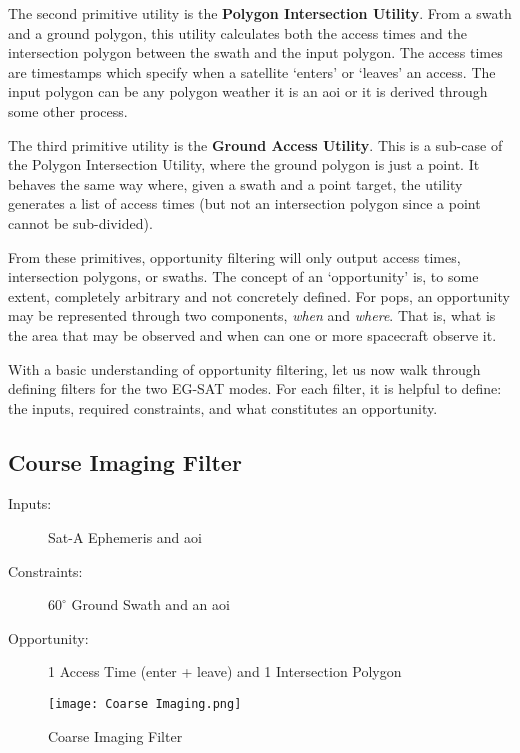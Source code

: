 The second primitive utility is the \textbf{Polygon Intersection Utility}.
From a swath and a ground polygon, this utility calculates both the access
times and the intersection polygon between the swath and the input polygon. The
access times are timestamps which specify when a satellite `enters' or `leaves'
an access. The input polygon can be any polygon weather it is an \gls{aoi} or
it is derived through some other process.

The third primitive utility is the \textbf{Ground Access Utility}. This is a
sub-case of the Polygon Intersection Utility, where the ground polygon is just
a point. It behaves the same way where, given a swath and a point target, the
utility generates a list of access times (but not an intersection polygon since
a point cannot be sub-divided).

From these primitives, opportunity filtering will only output access times,
intersection polygons, or swaths. The concept of an `opportunity' is, to some
extent, completely arbitrary and not concretely defined. For \gls{pops}, an
opportunity may be represented through two components, \textit{when} and
\textit{where}. That is, what is the area that may be observed and when can one
or more spacecraft observe it. 

With a basic understanding of opportunity filtering, let us now walk through
defining filters for the two EG-SAT modes. For each filter, it is helpful to
define: the inputs, required constraints, and what constitutes an opportunity.

\subsection{Course Imaging Filter}

\begin{description} 

    \item[Inputs:]  Sat-A Ephemeris and \gls{aoi}

    \item[Constraints:] $60^\circ$ Ground Swath and an \gls{aoi}

    \item[Opportunity:] 1 Access Time (enter + leave) and 1 Intersection Polygon

\end{description} 

\begin{figure}[h]
    \centering
    \texttt{[image: Coarse Imaging.png]} 
    \caption{Coarse Imaging Filter}
    \label{fig:filter-1} 
\end{figure}

